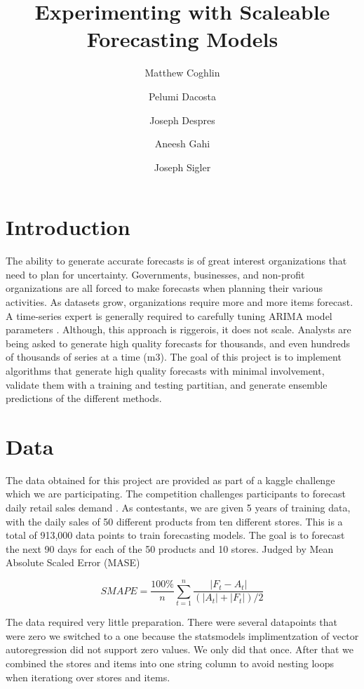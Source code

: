 \documentclass[12pt,twocolumn,letterpaper]{article}
\title{Experimenting with Scaleable Forecasting Models}
\author{
    Matthew Coghlin\\
  	\and
  	Pelumi Dacosta\\
    \and
    Joseph Despres\\
    \and
    Aneesh Gahi\\
    \and
    Joseph Sigler\\
}
\begin{document}
\maketitle


\section{Introduction}


The ability to generate accurate forecasts is of great interest organizations that need to plan for uncertainty. Governments, businesses, and non-profit organizations are all forced to make forecasts when planning their various activities. As datasets grow, organizations require more and more items forecast. A time-series expert is generally required to carefully tuning ARIMA model parameters \cite{taylor2018forecasting}. Although, this approach is riggerois, it does not scale. Analysts are being asked to generate high quality forecasts for thousands, and even hundreds of thousands of series at a time (m3). The goal of this project is to implement algorithms that generate high quality forecasts with minimal involvement, validate them with a training and testing partitian, and generate ensemble predictions of the different methods.

\section{Data}

The data obtained for this project are provided as part of a kaggle challenge which we are participating. The competition challenges participants to forecast daily retail sales demand \cite{kaggle}. As contestants, we are given 5 years of training data, with the daily sales of 50 different products from ten different stores. This is a total of 913,000 data points to train forecasting models. The goal is to forecast the next 90 days for each of the 50 products and 10 stores. Judged by Mean Absolute Scaled Error (MASE)

$${SMAPE}={\frac {100\%}{n}}\sum _{t=1}^{n}{\frac {\left|F_{t}-A_{t}\right|}{(|A_{t}|+|F_{t}|)/2}}$$

The data required very little preparation. There were several datapoints that were zero we switched to a one because the statsmodels implimentzation of vector autoregression did not support zero values. We only did that once. After that we combined the stores and items into one string column to avoid nesting loops when iterationg over stores and items.
\end{document}
